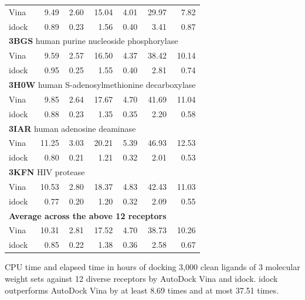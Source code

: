 \begin{table}[!ht]
\begin{tabular}{lrrrrrr}
Vina  &  9.49 &  2.60 & 15.04 &  4.01 & 29.97 &  7.82\\
idock &  0.89 &  0.23 &  1.56 &  0.40 &  3.41 &  0.87\\
\multicolumn{7}{l}{\textbf{3BGS} human purine nucleoside phosphorylase}\\
Vina  &  9.59 &  2.57 & 16.50 &  4.37 & 38.42 & 10.14\\
idock &  0.95 &  0.25 &  1.55 &  0.40 &  2.81 &  0.74\\
\multicolumn{7}{l}{\textbf{3H0W} human S-adenosylmethionine decarboxylase}\\
Vina  &  9.85 &  2.64 & 17.67 &  4.70 & 41.69 & 11.04\\
idock &  0.88 &  0.23 &  1.35 &  0.35 &  2.20 &  0.58\\
\multicolumn{7}{l}{\textbf{3IAR} human adenosine deaminase}\\
Vina  & 11.25 &  3.03 & 20.21 &  5.39 & 46.93 & 12.53\\
idock &  0.80 &  0.21 &  1.21 &  0.32 &  2.01 &  0.53\\
\multicolumn{7}{l}{\textbf{3KFN} HIV protease}\\
Vina  & 10.53 &  2.80 & 18.37 &  4.83 & 42.43 & 11.03\\
idock &  0.77 &  0.20 &  1.20 &  0.32 &  2.09 &  0.55\\
\multicolumn{7}{l}{\textbf{Average across the above 12 receptors}}\\
Vina  & 10.31 &  2.81 & 17.52 &  4.70 & 38.73 & 10.26\\
idock &  0.85 &  0.22 &  1.38 &  0.36 &  2.58 &  0.67\\
\end{tabular}
\begin{flushleft}\label{ExecutionTime} CPU time and elapsed time in hours of docking 3,000 clean ligands of 3 molecular weight sets against 12 diverse receptors by AutoDock Vina and idock. idock outperforms AutoDock Vina by at least 8.69 times and at most 37.51 times.
\end{flushleft}
\end{table}

